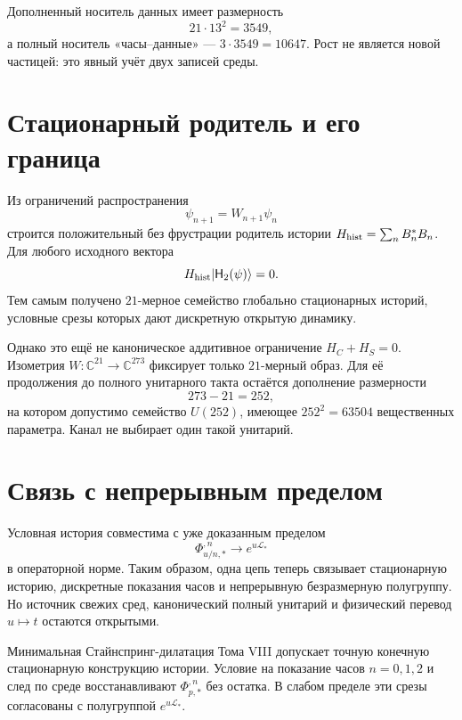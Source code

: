 Дополненный носитель данных имеет размерность
\begin{equation}
 21\cdot13^2=3549,
\end{equation}
а полный носитель «часы--данные» --- $3\cdot3549=10647$. Рост не является
новой частицей: это явный учёт двух записей среды.

\section{Стационарный родитель и его граница}

Из ограничений распространения
\begin{equation}
 \psi_{n+1}=W_{n+1}\psi_n
\end{equation}
строится положительный без фрустрации родитель истории
$H_{\rm hist}=\sum_nB_n^*B_n$. Для любого исходного вектора
\begin{equation}
 H_{\rm hist}|\mathsf H_2(\psi)\rangle=0.
 \label{eq:v8-pw-stationary-history}
\end{equation}
Тем самым получено $21$-мерное семейство глобально стационарных историй,
условные срезы которых дают дискретную открытую динамику.

Однако это ещё не каноническое аддитивное ограничение
$H_C+H_S=0$. Изометрия $W:\mathbb C^{21}\to\mathbb C^{273}$ фиксирует
только $21$-мерный образ. Для её продолжения до полного унитарного такта
остаётся дополнение размерности
\begin{equation}
 273-21=252,
\end{equation}
на котором допустимо семейство $U(252)$, имеющее $252^2=63504$
вещественных параметра. Канал не выбирает один такой унитарий.

\section{Связь с непрерывным пределом}

Условная история совместима с уже доказанным пределом
\begin{equation}
 \Phi_{u/n,*}^{,n}\longrightarrow e^{u\mathcal L_*}
\end{equation}
в операторной норме. Таким образом, одна цепь теперь связывает стационарную
историю, дискретные показания часов и непрерывную безразмерную полугруппу.
Но источник свежих сред, канонический полный унитарий и физический перевод
$u\mapsto t$ остаются открытыми.

\begin{theorem}
Минимальная Стайнспринг-дилатация Тома VIII допускает точную конечную
стационарную конструкцию истории. Условие на показание часов $n=0,1,2$ и
след по среде восстанавливают $\Phi_{p,*}^{,n}$ без остатка. В слабом
пределе эти срезы согласованы с полугруппой $e^{u\mathcal L_*}$.
\end{theorem}

